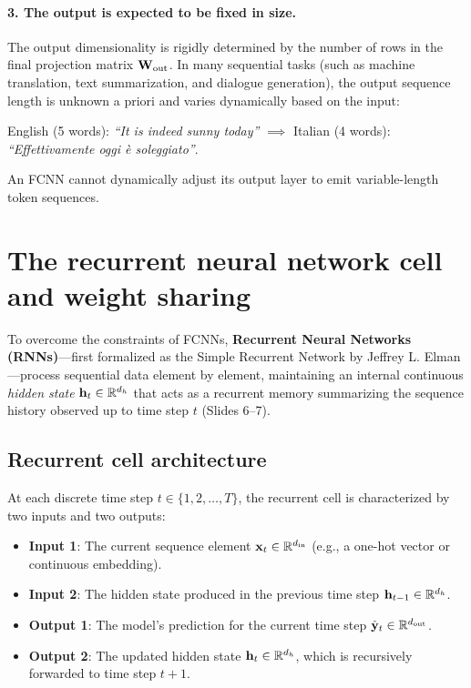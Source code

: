 \documentclass[../../main.tex]{subfiles}
\begin{document}
\paragraph{3. The output is expected to be fixed in size.}
The output dimensionality is rigidly determined by the number of rows in the final projection matrix $\mathbf{W}_{\text{out}}$. In many sequential tasks (such as machine translation, text summarization, and dialogue generation), the output sequence length is unknown a priori and varies dynamically based on the input:
\begin{center}
English (5 words): \textit{``It is indeed sunny today''} $\implies$ Italian (4 words): \textit{``Effettivamente oggi è soleggiato''}.
\end{center}
An FCNN cannot dynamically adjust its output layer to emit variable-length token sequences.

\section{The recurrent neural network cell and weight sharing}
\label{sec:rnn_cell}

To overcome the constraints of FCNNs, \textbf{Recurrent Neural Networks (RNNs)}---first formalized as the Simple Recurrent Network by Jeffrey L. Elman \cite{elman1990}---process sequential data element by element, maintaining an internal continuous \emph{hidden state} $\mathbf{h}_t \in \mathbb{R}^{d_h}$ that acts as a recurrent memory summarizing the sequence history observed up to time step $t$ (Slides 6--7).

\subsection{Recurrent cell architecture}
At each discrete time step $t \in \{1, 2, \dots, T\}$, the recurrent cell is characterized by two inputs and two outputs:
\begin{itemize}
    \item \textbf{Input 1}: The current sequence element $\mathbf{x}_t \in \mathbb{R}^{d_{\text{in}}}$ (e.g., a one-hot vector or continuous embedding).
    \item \textbf{Input 2}: The hidden state produced in the previous time step $\mathbf{h}_{t-1} \in \mathbb{R}^{d_h}$.
    \item \textbf{Output 1}: The model's prediction for the current time step $\hat{\mathbf{y}}_t \in \mathbb{R}^{d_{\text{out}}}$.
    \item \textbf{Output 2}: The updated hidden state $\mathbf{h}_t \in \mathbb{R}^{d_h}$, which is recursively forwarded to time step $t+1$.
\end{itemize}
\end{document}
